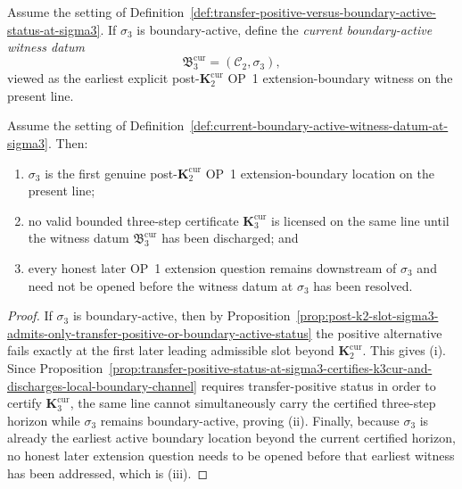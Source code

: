 \begin{definition}
\label{def:current-boundary-active-witness-datum-at-sigma3}
Assume the setting of Definition~\ref{def:transfer-positive-versus-boundary-active-status-at-sigma3}. If $\sigma_3$ is boundary-active, define the \emph{current boundary-active witness datum}
\[
 \mathfrak B_3^{\mathrm{cur}}=(\mathcal C_2,\sigma_3),
\]
viewed as the earliest explicit post-$\mathbf K_2^{\mathrm{cur}}$ OP~1 extension-boundary witness on the present line.
\end{definition}

\begin{proposition}
\label{prop:boundary-active-status-at-sigma3-normalizes-earliest-explicit-post-k2cur-extension-witness}
Assume the setting of Definition~\ref{def:current-boundary-active-witness-datum-at-sigma3}. Then:
\begin{enumerate}[label=(\roman*)]
 \item $\sigma_3$ is the first genuine post-$\mathbf K_2^{\mathrm{cur}}$ OP~1 extension-boundary location on the present line;
 \item no valid bounded three-step certificate $\mathbf K_3^{\mathrm{cur}}$ is licensed on the same line until the witness datum $\mathfrak B_3^{\mathrm{cur}}$ has been discharged; and
 \item every honest later OP~1 extension question remains downstream of $\sigma_3$ and need not be opened before the witness datum at $\sigma_3$ has been resolved.
\end{enumerate}
\end{proposition}

\begin{proof}
If $\sigma_3$ is boundary-active, then by Proposition~\ref{prop:post-k2-slot-sigma3-admits-only-transfer-positive-or-boundary-active-status} the positive alternative fails exactly at the first later leading admissible slot beyond $\mathbf K_2^{\mathrm{cur}}$. This gives (i). Since Proposition~\ref{prop:transfer-positive-status-at-sigma3-certifies-k3cur-and-discharges-local-boundary-channel} requires transfer-positive status in order to certify $\mathbf K_3^{\mathrm{cur}}$, the same line cannot simultaneously carry the certified three-step horizon while $\sigma_3$ remains boundary-active, proving (ii). Finally, because $\sigma_3$ is already the earliest active boundary location beyond the current certified horizon, no honest later extension question needs to be opened before that earliest witness has been addressed, which is (iii).
\end{proof}

